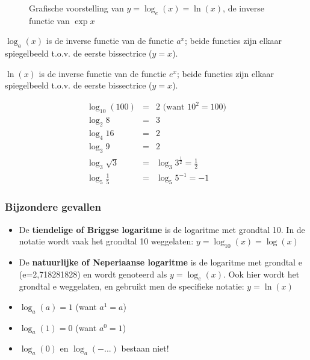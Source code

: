 \begin{figure}[H]
	\centering
	
	\caption{Grafische voorstelling van $y=\log_{e}\left(x\right)=\ln(x)$, de inverse functie van $\exp{x} $}
	
\end{figure}




$\log_{a}(x)$ is de inverse functie van
de functie $a^{x}$; beide functies zijn elkaar spiegelbeeld
t.o.v. de eerste bissectrice ($y=x$).

$\ln(x)$ is de inverse functie van de functie
$e^{x}$; beide functies zijn elkaar spiegelbeeld
t.o.v. de eerste bissectrice ($y=x$).



\begin{voorbeeld}
	\begin{eqnarray*}
\log_{10}\left(100\right)&=&2 \text{ (want $10^{2}=100$)}\\
\log_{2}8&=&3\\
\log_{4}16&=&2\\
\log_{3}9&=&2\\
\log_{3}\sqrt{3}&=&\log_{3}3^{\frac{1}{2}}=\frac{1}{2}\\
\log_{5}\frac{1}{5}&=&\log_{5}5^{-1}=-1
	\end{eqnarray*}
\end{voorbeeld}


\subsubsection{Bijzondere gevallen}
\begin{itemize}
\item De \textbf{tiendelige of Briggse logaritme} is de logaritme met grondtal
10. In de notatie wordt vaak het grondtal 10 weggelaten: $y=\log_{10}\left(x\right)=\log\left(x\right)$
\item De \textbf{natuurlijke of Neperiaanse logaritme} is de logaritme met
grondtal e (e=2,718281828) en wordt genoteerd als $y=\log_{e}(x)$. Ook hier wordt het grondtal e weggelaten, en gebruikt men de specifieke
notatie: $y=\ln(x)$
\item $\log_{a}\left(a\right)=1$ (want $a^{1}=a$)
\item $\log_{a}\left(1\right)=0$ (want $a^{0}=1$)
\item $\log_{a}\left(0\right)$ en $\log_{a}\left(-...\right)$
bestaan niet!
\end{itemize}


